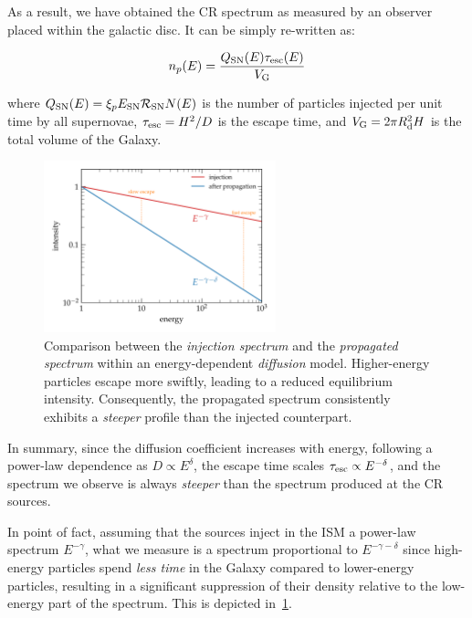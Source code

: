 As a result, we have obtained the CR spectrum as measured by an observer placed within the galactic disc.
%
It can be simply re-written as:
%
\begin{remark}
\begin{equation}
n_p(E) = \frac{Q_{\rm SN}(E) \tau_{\rm esc}(E)}{V_{\rm G}}
\end{equation}
\end{remark}
%
where $Q_{\rm SN}(E) = \xi_p E_{\rm SN} \mathcal R_{\rm SN} N(E)$ is the number of particles injected per unit time by all supernovae, $\tau_{\rm esc} = H^2/D$ is the escape time, and $V_{\rm G} = 2\pi R_{\rm d}^2H$ is the total volume of the Galaxy.

\begin{figure}[t]
\centering
\includegraphics[width=0.6\textwidth]{figures/diffusion_softening.pdf}
\caption{Comparison between the \emph{injection spectrum} and the \emph{propagated spectrum} within an energy-dependent \emph{diffusion} model. Higher-energy particles escape more swiftly, leading to a reduced equilibrium intensity. Consequently, the propagated spectrum consistently exhibits a \emph{steeper} profile than the injected counterpart.}
\label{fig:softening}
\end{figure}

In summary, since the diffusion coefficient increases with energy, following a power-law dependence as $D \propto E^{\delta}$, the escape time scales $\tau_{\rm esc} \propto E^{-\delta}$, and the spectrum we observe is always \emph{steeper} than the spectrum produced at the CR sources.

In point of fact, assuming that the sources inject in the ISM a power-law spectrum $E^{-\gamma}$, what we measure is a spectrum proportional to $E^{-\gamma-\delta}$ since high-energy particles spend \emph{less time} in the Galaxy compared to lower-energy particles, resulting in a significant suppression of their density relative to the low-energy part of the spectrum.
%
This is depicted in~\cref{fig:softening}. 


